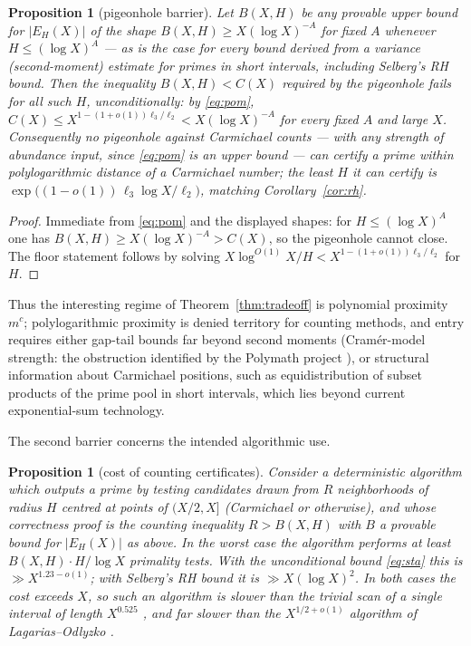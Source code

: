 \documentclass[11pt]{amsart}
\newtheorem{proposition}[theorem]{Proposition}
\newcommand{\CC}{C}
\begin{document}
\begin{proposition}[pigeonhole barrier]
\label{prop:barrier}
Let $B(X, H)$ be any provable upper bound for $|E_H(X)|$ of the shape
$B(X,H) \ge X (\log X)^{-A}$ for fixed $A$ whenever
$H \le (\log X)^{A}$ --- as is the case for every bound derived from a
variance (second-moment) estimate for primes in short intervals, including
Selberg's RH bound. Then the inequality $B(X,H) < \CC(X)$ required by the
pigeonhole fails for all such $H$, unconditionally: by \eqref{eq:pom},
$\CC(X) \le X^{1-(1+o(1))\ell_3/\ell_2} < X(\log X)^{-A}$ for every fixed $A$
and large $X$. Consequently no pigeonhole against Carmichael counts --- with
\emph{any} strength of abundance input, since \eqref{eq:pom} is an upper
bound --- can certify a prime within polylogarithmic distance of a Carmichael
number; the least $H$ it can certify is
$\exp\bigl((1-o(1))\,\ell_3 \log X/\ell_2\bigr)$, matching
Corollary~\ref{cor:rh}.
\end{proposition}

\begin{proof}
Immediate from \eqref{eq:pom} and the displayed shapes: for
$H \le (\log X)^A$ one has $B(X,H) \ge X(\log X)^{-A} > \CC(X)$, so the
pigeonhole cannot close. The floor statement follows by solving
$X \log^{O(1)} X/H < X^{1-(1+o(1))\ell_3/\ell_2}$ for $H$.
\end{proof}

Thus the interesting regime of Theorem~\ref{thm:tradeoff} is polynomial
proximity $m^{c}$; polylogarithmic proximity is denied territory for
counting methods, and entry requires either gap-tail
bounds far beyond second moments (Cram\'er-model strength: the obstruction
identified by the Polymath project \cite{Pol}), or
structural information about Carmichael positions, such as equidistribution of
subset products of the \cite{AGP} prime pool in short intervals, which lies
beyond current exponential-sum technology.

The second barrier concerns the intended algorithmic use.

\begin{proposition}[cost of counting certificates]
\label{prop:cost}
Consider a deterministic algorithm which outputs a prime by testing candidates
drawn from $R$ neighborhoods of radius $H$ centred at points of $(X/2, X]$
(Carmichael or otherwise), and whose correctness proof is the counting
inequality $R > B(X,H)$ with $B$ a provable bound for $|E_H(X)|$ as above.
In the worst case the algorithm performs at least $B(X,H) \cdot H / \log X$
primality tests. With the unconditional bound \eqref{eq:sta} this is
$\gg X^{1.23 - o(1)}$; with Selberg's RH bound it is $\gg X (\log X)^{2}$.
In both cases the cost exceeds $X$, so such an algorithm is slower than the
trivial scan of a single interval of length $X^{0.525}$ \cite{BHP}, and far
slower than the $X^{1/2+o(1)}$ algorithm of Lagarias--Odlyzko \cite{LO}.
\end{proposition}
\end{document}
